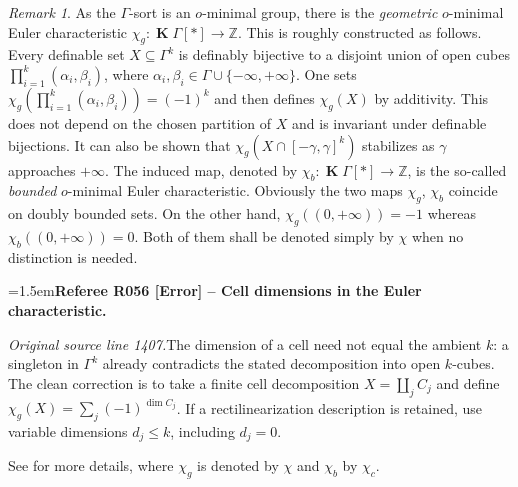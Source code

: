 \documentclass[12pt]{amsart}
\newcommand{\RefereeRemark}[4]{%
  \par\medskip\begingroup\normalfont\small\color{RefereePurple}%
  \emergencystretch=1.5em\noindent\textbf{Referee R#1 [#2] -- #3.}\par\nobreak\noindent #4\par
  \endgroup\medskip
}
\newcommand{\memph}[1]{{\color{magenta}\emph{#1}}}
\theoremstyle{plain}
\theoremstyle{definition}
\theoremstyle{remark}
\newtheorem{rem}[thm]{Remark}
\newtheorem{nota}[thm]{Notation}
\numberwithin{equation}{section}
\theoremstyle{plain}
\newcommand{\Z}{\mathds{Z}}
\newcommand{\omin}{$o$\nobreakdash}
\newcommand{\0}{\emptyset}
\newcommand{\fun}{\longrightarrow}
\newcommand{\sub}{\subseteq}
\DeclareMathOperator{\ggk}{\mathbf{K}}
\begin{document}

\begin{rem}
As  the  $\Gamma$-sort is an \omin-minimal group, there is  the \memph{geometric} \omin-minimal Euler characteristic  $\chi_g : \ggk \Gamma[*] \fun \Z$. This is roughly constructed as follows. Every definable set $X \sub \Gamma^k$ is definably bijective to a disjoint union of open cubes $\prod^k_{i= 1}(\alpha_i,\beta_i)$, where $\alpha_i, \beta_i \in \Gamma \cup \{-\infty, +\infty\}$. One sets $\chi_g(\prod^k_{i= 1}(\alpha_i,\beta_i)) = (-1)^k$ and then defines $\chi_g(X)$ by additivity. This does not depend on the chosen partition of $X$ and is invariant under definable bijections. It can also be shown that $\chi_g(X \cap [-\gamma, \gamma]^k)$ stabilizes as $\gamma$ approaches $+\infty$. The induced map, denoted by $\chi_b: \ggk \Gamma[*] \fun \Z$,  is the so-called \memph{bounded} \omin-minimal Euler characteristic. Obviously the two maps $\chi_g$, $\chi_b$  coincide on doubly bounded sets. On the other hand,  $\chi_g((0,+\infty))=-1$ whereas $\chi_b((0,+\infty))=0$. Both of them shall be denoted simply by $\chi$ when no distinction is needed.

\RefereeRemark{056}{Error}{Cell dimensions in the Euler characteristic}{%
\textit{Original source line 1407.}\quad The dimension of a cell need not equal the ambient $k$: a singleton in $\Gamma^k$ already contradicts the stated decomposition into open $k$-cubes. The clean correction is to take a finite cell decomposition $X=\coprod_j C_j$ and define $\chi_g(X)=\sum_j(-1)^{\dim C_j}$. If a rectilinearization description is retained, use variable dimensions $d_j\leq k$, including $d_j=0$.
}

See \cite[\S~9]{hrushovski:kazhdan:integration:vf} for more details, where $\chi_g$ is denoted by $\chi$ and $\chi_b$ by $\chi_c$.
\end{rem}
\end{document}

